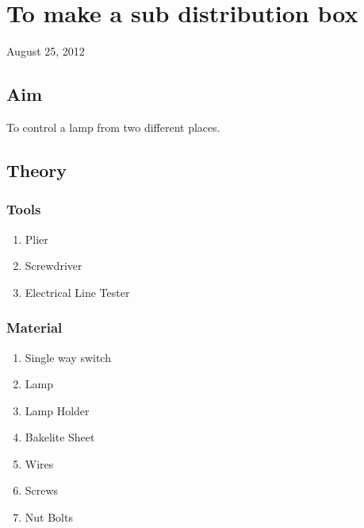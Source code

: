 \chapter{To make a sub distribution box}
\begin{flushright}
August 25, 2012
\end{flushright}
\section{Aim}
To control a lamp from two different places.

\section{Theory}
	\subsection {Tools}
		\begin{enumerate}
			\item Plier
			\item Screwdriver
			\item Electrical Line Tester
		\end{enumerate}
	\subsection {Material}
		\begin{enumerate}
			\item Single way switch
			\item Lamp
			\item Lamp Holder
			\item Bakelite Sheet
			\item Wires
			\item Screws
			\item Nut Bolts
		\end{enumerate}
